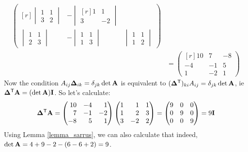 \documentclass[fleqn,a4paper,11pt]{article}
\begin{document}
\begin{enumerate}[label=\textbf{\arabic*.}]
\begin{align*}
\begin{pmatrix*}[r]
     \begin{vmatrix}
      1 & 1 \\
      3 & 2
     \end{vmatrix} &
     -\begin{vmatrix*}[r]
      1 & 1 \\
      3 & -2
     \end{vmatrix*} \\[3ex]
     \begin{vmatrix}
      1 & 1 \\
      2 & 3
     \end{vmatrix} &
     -\begin{vmatrix}
      1 & 1 \\
      1 & 3
     \end{vmatrix} &
     \begin{vmatrix}
      1 & 1 \\
      1 & 2
     \end{vmatrix}
    \end{pmatrix*} \\
    &= \begin{pmatrix*}[r]
     10 & 7 & -8 \\
     -4 & -1 & 5 \\
     1 & -2 & 1
    \end{pmatrix*}
   \end{align*}
   Now the condition \( A_{ij}\mathbf{\Delta}_{ik} = \delta_{jk} \det \mathbf{A}\) is
   equivalent to \((\mathbf{\Delta}^{\mathsf T})_{ki}  A_{ij} = \delta_{jk} \det \mathbf{A}\),
   ie \(\mathbf{\Delta}^{\mathsf T}\mathbf{A} = (\det \mathbf{A})\mathbf{I}\). So let's calculate:
   \begin{equation*}
    \tran{\mat \Delta}\mat A =
    \begin{pmatrix*}[r]
     10 & -4 & 1 \\
     7 & -1 & -2 \\
     -8 & 5 & 1
    \end{pmatrix*}
    \begin{pmatrix*}[r]
     1 & 1 & 1 \\
     1 & 2 & 3 \\
     3 & -2 & 2
    \end{pmatrix*}
    = \begin{pmatrix}
     9 & 0 & 0 \\
     0 & 9 & 0 \\
     0 & 0 & 9
    \end{pmatrix}
    = 9\mat I
   \end{equation*}
   Using Lemma \ref{lemma_sarrus}, we can also calculate that indeed,
   \(\det \mathbf{A} = 4 + 9 - 2 - (6 - 6 + 2) = 9\).


\end{enumerate}
\end{document}
